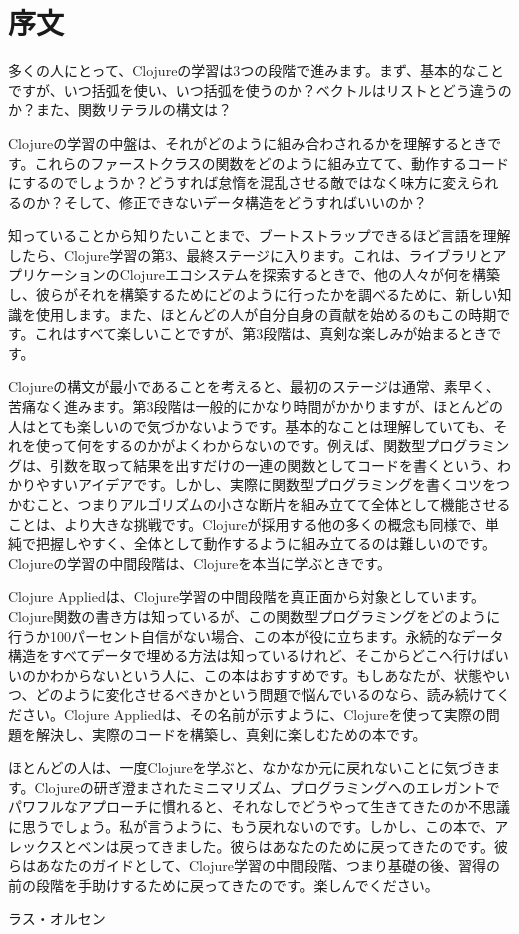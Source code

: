 \section{序文}

多くの人にとって、Clojureの学習は3つの段階で進みます。まず、基本的なことですが、いつ括弧を使い、いつ括弧を使うのか？ベクトルはリストとどう違うのか？また、関数リテラルの構文は？

Clojureの学習の中盤は、それがどのように組み合わされるかを理解するときです。これらのファーストクラスの関数をどのように組み立てて、動作するコードにするのでしょうか？どうすれば怠惰を混乱させる敵ではなく味方に変えられるのか？そして、修正できないデータ構造をどうすればいいのか？

知っていることから知りたいことまで、ブートストラップできるほど言語を理解したら、Clojure学習の第3、最終ステージに入ります。これは、ライブラリとアプリケーションのClojureエコシステムを探索するときで、他の人々が何を構築し、彼らがそれを構築するためにどのように行ったかを調べるために、新しい知識を使用します。また、ほとんどの人が自分自身の貢献を始めるのもこの時期です。これはすべて楽しいことですが、第3段階は、真剣な楽しみが始まるときです。

Clojureの構文が最小であることを考えると、最初のステージは通常、素早く、苦痛なく進みます。第3段階は一般的にかなり時間がかかりますが、ほとんどの人はとても楽しいので気づかないようです。基本的なことは理解していても、それを使って何をするのかがよくわからないのです。例えば、関数型プログラミングは、引数を取って結果を出すだけの一連の関数としてコードを書くという、わかりやすいアイデアです。しかし、実際に関数型プログラミングを書くコツをつかむこと、つまりアルゴリズムの小さな断片を組み立てて全体として機能させることは、より大きな挑戦です。Clojureが採用する他の多くの概念も同様で、単純で把握しやすく、全体として動作するように組み立てるのは難しいのです。Clojureの学習の中間段階は、Clojureを本当に学ぶときです。

Clojure Appliedは、Clojure学習の中間段階を真正面から対象としています。Clojure関数の書き方は知っているが、この関数型プログラミングをどのように行うか100パーセント自信がない場合、この本が役に立ちます。永続的なデータ構造をすべてデータで埋める方法は知っているけれど、そこからどこへ行けばいいのかわからないという人に、この本はおすすめです。もしあなたが、状態やいつ、どのように変化させるべきかという問題で悩んでいるのなら、読み続けてください。Clojure Appliedは、その名前が示すように、Clojureを使って実際の問題を解決し、実際のコードを構築し、真剣に楽しむための本です。

ほとんどの人は、一度Clojureを学ぶと、なかなか元に戻れないことに気づきます。Clojureの研ぎ澄まされたミニマリズム、プログラミングへのエレガントでパワフルなアプローチに慣れると、それなしでどうやって生きてきたのか不思議に思うでしょう。私が言うように、もう戻れないのです。しかし、この本で、アレックスとベンは戻ってきました。彼らはあなたのために戻ってきたのです。彼らはあなたのガイドとして、Clojure学習の中間段階、つまり基礎の後、習得の前の段階を手助けするために戻ってきたのです。楽しんでください。

ラス・オルセン
